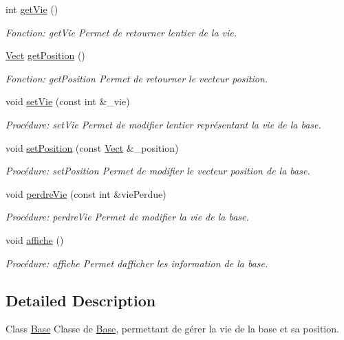 \begin{DoxyCompactItemize}
int \hyperlink{classBase_a922b45a3578821dd6ab666206b1a637e}{get\+Vie} ()
\begin{DoxyCompactList}\small\item\em Fonction\+: get\+Vie Permet de retourner l\textquotesingle{}entier de la vie. \end{DoxyCompactList}\item 
\hyperlink{classVect}{Vect} \hyperlink{classBase_a16d0ed1836dfedfb51d54308d22b4a38}{get\+Position} ()
\begin{DoxyCompactList}\small\item\em Fonction\+: get\+Position Permet de retourner le vecteur position. \end{DoxyCompactList}\item 
void \hyperlink{classBase_a92e0991ffd34efb2f2d6db3f3bd4093d}{set\+Vie} (const int \&\+\_\+vie)
\begin{DoxyCompactList}\small\item\em Procédure\+: set\+Vie Permet de modifier l\textquotesingle{}entier représentant la vie de la base. \end{DoxyCompactList}\item 
void \hyperlink{classBase_afe9eb29bdaf866dc20af0b833209e29e}{set\+Position} (const \hyperlink{classVect}{Vect} \&\+\_\+position)
\begin{DoxyCompactList}\small\item\em Procédure\+: set\+Position Permet de modifier le vecteur position de la base. \end{DoxyCompactList}\item 
void \hyperlink{classBase_a0471688678ab6e2aba5ee69d290c2e20}{perdre\+Vie} (const int \&vie\+Perdue)
\begin{DoxyCompactList}\small\item\em Procédure\+: perdre\+Vie Permet de modifier la vie de la base. \end{DoxyCompactList}\item 
void \hyperlink{classBase_a90f460bea595fc507cab1b6a2131350c}{affiche} ()
\begin{DoxyCompactList}\small\item\em Procédure\+: affiche Permet d\textquotesingle{}afficher les information de la base. \end{DoxyCompactList}\end{DoxyCompactItemize}


\subsection{Detailed Description}
Class \hyperlink{classBase}{Base} Classe de \hyperlink{classBase}{Base}, permettant de gérer la vie de la base et sa position. 

